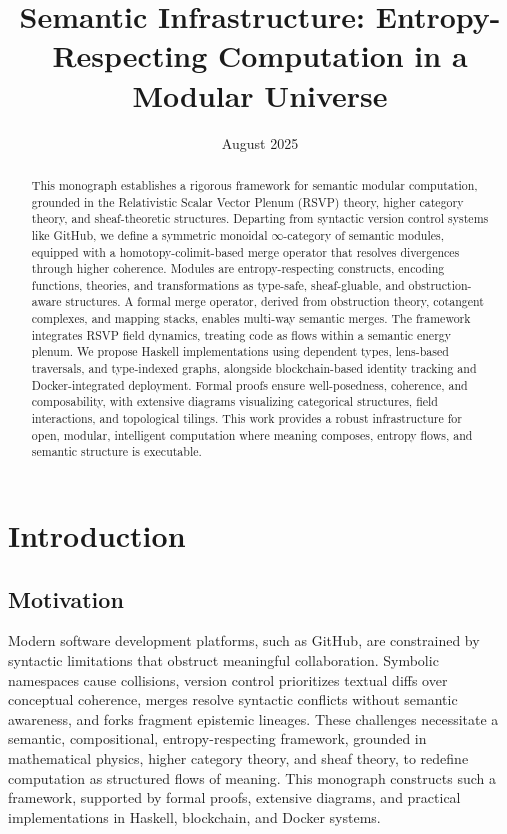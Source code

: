 \documentclass[12pt]{article}
\title{Semantic Infrastructure: Entropy-Respecting Computation in a Modular Universe}
\author{}
\date{August 2025}
\begin{document}
\maketitle

\begin{abstract}
This monograph establishes a rigorous framework for semantic modular computation, grounded in the Relativistic Scalar Vector Plenum (RSVP) theory, higher category theory, and sheaf-theoretic structures. Departing from syntactic version control systems like GitHub, we define a symmetric monoidal $\infty$-category of semantic modules, equipped with a homotopy-colimit-based merge operator that resolves divergences through higher coherence. Modules are entropy-respecting constructs, encoding functions, theories, and transformations as type-safe, sheaf-gluable, and obstruction-aware structures. A formal merge operator, derived from obstruction theory, cotangent complexes, and mapping stacks, enables multi-way semantic merges. The framework integrates RSVP field dynamics, treating code as flows within a semantic energy plenum. We propose Haskell implementations using dependent types, lens-based traversals, and type-indexed graphs, alongside blockchain-based identity tracking and Docker-integrated deployment. Formal proofs ensure well-posedness, coherence, and composability, with extensive diagrams visualizing categorical structures, field interactions, and topological tilings. This work provides a robust infrastructure for open, modular, intelligent computation where meaning composes, entropy flows, and semantic structure is executable.
\end{abstract}

\section{Introduction}
\label{sec:introduction}

\subsection{Motivation}
Modern software development platforms, such as GitHub, are constrained by syntactic limitations that obstruct meaningful collaboration. Symbolic namespaces cause collisions, version control prioritizes textual diffs over conceptual coherence, merges resolve syntactic conflicts without semantic awareness, and forks fragment epistemic lineages. These challenges necessitate a semantic, compositional, entropy-respecting framework, grounded in mathematical physics, higher category theory, and sheaf theory, to redefine computation as structured flows of meaning. This monograph constructs such a framework, supported by formal proofs, extensive diagrams, and practical implementations in Haskell, blockchain, and Docker systems.
\end{document}

